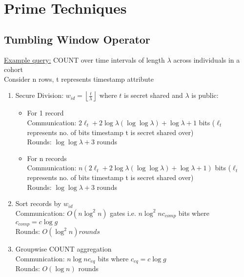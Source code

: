 \section{Prime Techniques}

\subsection{Tumbling Window Operator}
\underline{Example query:} COUNT over time intervals of length $\lambda$ across individuals in a cohort \\
Consider n rows, t represents timestamp attribute 
\begin{enumerate}
\item Secure Division: $w_{id} = \left\lfloor \frac{t}{\lambda} \right\rfloor$ where $t$ is secret shared and $\lambda$ is public:
\begin{itemize}
\item For 1 record \\
Communication: $2\ell_{t} + 2\log \lambda (\log \log \lambda) + \log \lambda + 1$ bits ($\ell_{t}$ represents no. of bits timestamp t is secret shared over) \\
Rounds: $\log \log \lambda + 3$ rounds
\item For n records \\
Communication: $n(2\ell_{t} + 2\log \lambda (\log \log \lambda) + \log \lambda + 1)$ bits ($\ell_{t}$ represents no. of bits timestamp t is secret shared over) \\
Rounds: $\log \log \lambda + 3$ rounds
\end{itemize}
\item Sort records by $w_{id}$ \\
Communication: $O(n \log^2 n)$ gates i.e. $n \log^2 n c_{comp}$ bits where $c_{comp} = c \log g$ \\
Rounds: $O(\log^2 n) rounds$
\item Groupwise COUNT aggregation  \\
Communication: $n \log n c_{eq}$ bits where $c_{eq} = c \log g$ \\
Rounds: $O(\log n)$ rounds
\end{enumerate}

